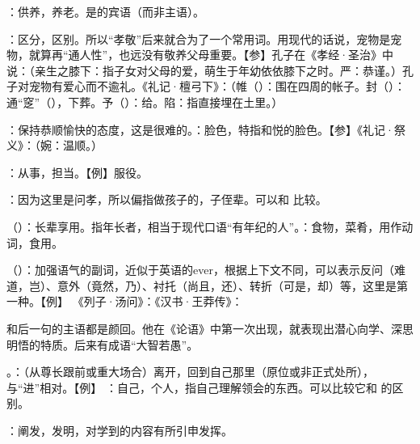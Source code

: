 {
\item {}：供养，养老。是的宾语（而非主语）。
\item {}：区分，区别。所以“孝敬”后来就合为了一个常用词。用现代的话说，宠物是宠物，就算再“通人性”，也远没有敬养父母重要。【参】孔子在《孝经·圣治》中说：（亲生之膝下：指子女对父母的爱，萌生于年幼依依膝下之时。严：恭谨。）孔子对宠物有爱心而不逾礼。《礼记·檀弓下》：（帷（）：围在四周的帐子。封（）：通“窆”（），下葬。予（）：给。陷：指直接埋在土里。）
}
{} %


{
\item {}：保持恭顺愉快的态度，这是很难的。：脸色，特指和悦的脸色。【参】《礼记·祭义》：（婉：温顺。）
\item {}：从事，担当。【例】服役。
\item {}：因为这里是问孝，所以偏指做孩子的，子侄辈。可以和  比较。
\item {}（）：长辈享用。指年长者，相当于现代口语“有年纪的人”。：食物，菜肴，用作动词，食用。
\item {}（）：加强语气的副词，近似于英语的ever，根据上下文不同，可以表示反问（难道，岂）、意外（竟然，乃）、衬托（尚且，还）、转折（可是，却）等，这里是第一种。【例】   《列子·汤问》：《汉书·王莽传》：
}
{}


{
\item {}和后一句的主语都是颜回。他在《论语》中第一次出现，就表现出潜心向学、深思明悟的特质。后来有成语“大智若愚”。
\item {}。：（从尊长跟前或重大场合）离开，回到自己那里（原位或非正式处所），与“进”相对。【例】 ：自己，个人，指自己理解领会的东西。可以比较它和  的区别。
\item {}：阐发，发明，对学到的内容有所引申发挥。
}
{}


